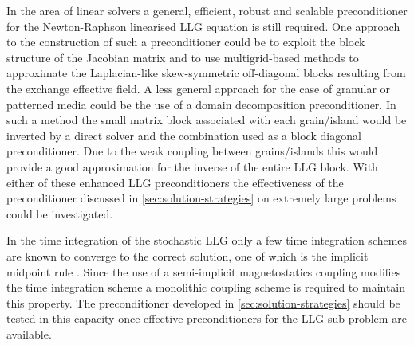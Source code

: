 In the area of linear solvers a general, efficient, robust and scalable preconditioner for the Newton-Raphson linearised LLG equation is still required.
One approach to the construction of such a preconditioner could be to exploit the block structure of the Jacobian matrix and to use multigrid-based methods to approximate the Laplacian-like skew-symmetric off-diagonal blocks resulting from the exchange effective field.
A less general approach for the case of granular or patterned media could be the use of a domain decomposition preconditioner.
In such a method the small matrix block associated with each grain/island would be inverted by a direct solver and the combination used as a block diagonal preconditioner.
Due to the weak coupling between grains/islands this would provide a good approximation for the inverse of the entire LLG block.
With either of these enhanced LLG preconditioners the effectiveness of the preconditioner discussed in \cref{sec:solution-strategies} on extremely large problems could be investigated.


In the time integration of the stochastic LLG only a few time integration schemes are known to converge to the correct solution, one of which is the implicit midpoint rule \cite{DAquino2006}.
Since the use of a semi-implicit magnetostatics coupling modifies the time integration scheme a monolithic coupling scheme is required to maintain this property.
The preconditioner developed in \cref{sec:solution-strategies} should be tested in this capacity once effective preconditioners for the LLG sub-problem are available.



